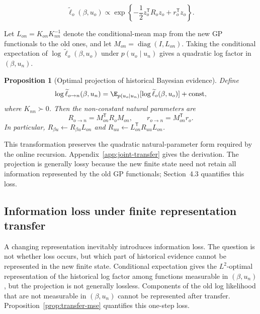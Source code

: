 \documentclass[twoside]{article}
\newcommand{\trans}{\mathsf T}
\newtheorem{proposition}{Proposition}
\begin{document}
\begin{equation}
 \widetilde{\ell}_o(\beta,u_o) \propto
 \exp\!\left\{ -\frac12 z_o^\trans R_o z_o+r_o^\trans z_o \right\}.
\label{eq:old-like}
\end{equation}

Let $L_{on}=K_{on}K_{nn}^{-1}$ denote the conditional-mean map from the new GP functionals to the old ones, and let $M_{on}=\operatorname{diag}(I,L_{on})$. Taking the conditional expectation of $\log \widetilde{\ell}_o(\beta,u_o)$ under $p(u_o\mid u_n)$ gives a quadratic log factor in $(\beta,u_n)$.
\begin{proposition}[Optimal projection of historical Bayesian evidence]
\label{prop:joint-transfer}
Define
\begin{equation}
 \log\widetilde\ell_{o\rightarrow n}(\beta,u_n)
 =\E_{p(u_o\mid u_n)}[\log\widetilde\ell_o(\beta,u_o)]+\mathrm{const},
 \label{eq:projection}
\end{equation}
where $K_{nn}\succ0$. Then the non-constant natural parameters are
\begin{equation}
 R_{o\rightarrow n}=M_{on}^{\trans}R_oM_{on},
 \qquad r_{o\rightarrow n}=M_{on}^{\trans}r_o.
 \label{eq:transfer}
\end{equation}
In particular, $R_{\beta u}\leftarrow R_{\beta u}L_{on}$ and
$R_{uu}\leftarrow L_{on}^{\trans}R_{uu}L_{on}$.
\end{proposition}
This transformation preserves the quadratic natural-parameter form required by the online recursion. Appendix~\ref{app:joint-transfer} gives the derivation. The projection is generally lossy because the new finite state need not retain all information represented by the old GP functionals; Section~4.3 quantifies this loss.

\subsection{Information loss under finite representation transfer}

A changing representation inevitably introduces information loss. The question is not whether loss occurs, but which part of historical evidence cannot be represented in the new finite state. Conditional expectation gives the $L^2$-optimal representation of the historical log factor among functions measurable in $(\beta,u_n)$, but the projection is not generally lossless. Components of the old log likelihood that are not measurable in $(\beta,u_n)$ cannot be represented after transfer. Proposition~\ref{prop:transfer-mse} quantifies this one-step loss.
\end{document}

